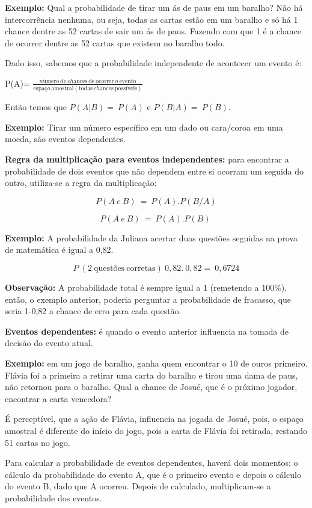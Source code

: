 \textbf{Exemplo:} Qual a probabilidade de tirar um ás de paus em um
baralho? Não há intercorrência nenhuma, ou seja, todas as cartas estão
em um baralho e só há 1 chance dentre as 52 cartas de sair um ás de
paus. Fazendo com que 1 é a chance de ocorrer dentre as 52 cartas que
existem no baralho todo.

Dado isso, sabemos que a probabilidade independente de acontecer um
evento é:

P(A)=
\(\frac{nú\text{mero}\ \text{de}\ ch\text{ances}\ \text{de}\ \text{ocorrer}\ o\ \text{evento}}{\text{espa}ço\ \text{amostral}(\text{todas}\ ch\text{ances}\ \text{poss}í\text{veis})}\)

Então temos que \(P(A|B) = \ P(A)\) e \(P(B|A) = \ P(B)\).

\textbf{Exemplo:} Tirar um número específico em um dado ou cara/coroa em
uma moeda, são eventos dependentes.

\textbf{Regra da multiplicação para eventos independentes:} para
encontrar a probabilidade de dois eventos que não dependem entre si
ocorram um seguida do outro, utiliza-se a regra da multiplicação:

\[P(A\ e\ B)\  = \ P(A).P(B/A)\]

\[P(A\ e\ B)\  = \ P(A).P(B)\ \]

\textbf{Exemplo:} A probabilidade da Juliana acertar duas questões
seguidas na prova de matemática é igual a 0,82.

\[P\ (2\ \text{quest}õ\text{es}\ \text{corretas})\ 0,82.\ 0,82 = \ 0,6724\]

\textbf{Observação:} A probabilidade total é sempre igual a 1 (remetendo
a 100\%), então, o exemplo anterior, poderia perguntar a probabilidade
de fracasso, que seria 1-0,82 a chance de erro para cada questão.

\textbf{Eventos dependentes:} é quando o evento anterior influencia na
tomada de decisão do evento atual.

\textbf{Exemplo:} em um jogo de baralho, ganha quem encontrar o 10 de
ouros primeiro. Flávia foi a primeira a retirar uma carta do baralho e
tirou uma dama de paus, não retornou para o baralho. Qual a chance de
Josué, que é o próximo jogador, encontrar a carta vencedora?

É perceptível, que a ação de Flávia, influencia na jogada de Josué,
pois, o espaço amostral é diferente do início do jogo, pois a carta de
Flávia foi retirada, restando 51 cartas no jogo.

Para calcular a probabilidade de eventos dependentes, haverá dois
momentos: o cálculo da probabilidade do evento A, que é o primeiro
evento e depois o cálculo do evento B, dado que A ocorreu. Depois de
calculado, multiplicam-se a probabilidade dos eventos.

